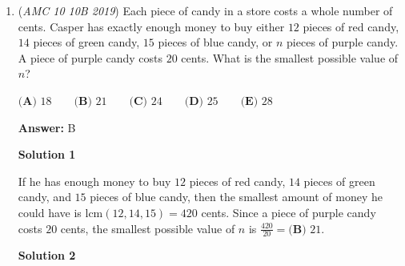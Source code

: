 \begin{enumerate}
 Substituting back for $n$:
 \[n+2 = 21 \implies n = 19\]

 The sum of the digits of $n$ is $1 + 9 = \boxed{10}$.

 



\textbf{Solution 7 (Simpler Solution 1, No Experimentation)}

Like in solution 1, continue until $n^2 + 4n - 437 = 0$

 Quadratic formula:

 
 \[\frac{-4 \pm \sqrt{1764}}{2}\].

 Because $n$ is an integer, assume 1764 is a perfect square. The last digit of 1764 is 4, meaning that the number $k^2 = 1764$, $k$ ends in either 2 or 8. Then, $\sqrt{16} < \sqrt{17} < \sqrt{25}$, so taking the former of the two, we have that our possible square roots are 42 or 48. It then follows that $40^2 < k^2 < 50^2$, and that $k^2$ is much closer to $40^2$ than $50^2$, so our desired $k = 42$. It follows that $n = 19$ and the sum of the digits is $\boxed{10}$.

 To learn this mental math trick, the video below credited to the Organic Chemistry Tutor quite well verses this topic.

 


	\item (\textit{AMC 10 10B 2019}) Each piece of candy in a store costs a whole number of cents. Casper has exactly enough money to buy either $12$ pieces of red candy, $14$ pieces of green candy, $15$ pieces of blue candy, or $n$ pieces of purple candy. A piece of purple candy costs $20$ cents. What is the smallest possible value of $n$?


 $\textbf{(A) } 18 \qquad \textbf{(B) } 21 \qquad \textbf{(C) } 24\qquad \textbf{(D) } 25 \qquad \textbf{(E) } 28$

 \textbf{Answer: }B



\textbf{Solution 1}

If he has enough money to buy $12$ pieces of red candy, $14$ pieces of green candy, and $15$ pieces of blue candy, then the smallest amount of money he could have is $\text{lcm}{(12,14,15)} = 420$ cents. Since a piece of purple candy costs $20$ cents, the smallest possible value of $n$ is $\frac{420}{20} = \boxed{\textbf{(B) }  21}$.

 



\textbf{Solution 2}


\end{enumerate}
